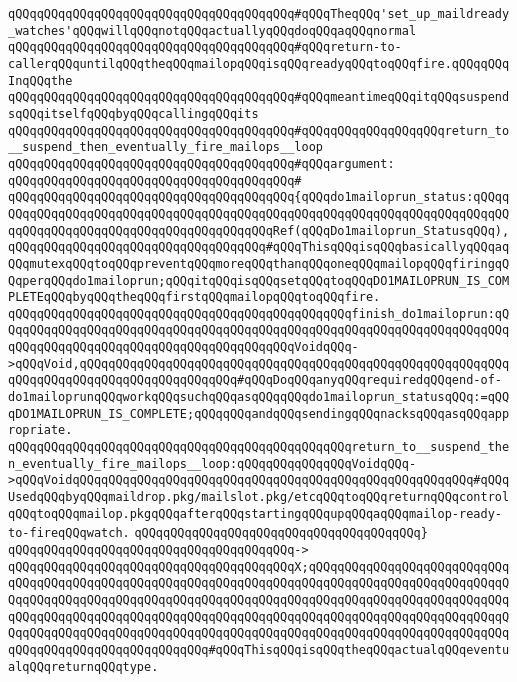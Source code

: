 \verb|qQQqqQQqqQQqqQQqqQQqqQQqqQQqqQQqqQQqqQQq#qQQqTheqQQq'set_up_maildready_watches'qQQqwillqQQqnotqQQqactuallyqQQqdoqQQqaqQQqnormal|\newline
\verb|qQQqqQQqqQQqqQQqqQQqqQQqqQQqqQQqqQQqqQQq#qQQqreturn-to-callerqQQquntilqQQqtheqQQqmailopqQQqisqQQqreadyqQQqtoqQQqfire.qQQqqQQqInqQQqthe|\newline
\verb|qQQqqQQqqQQqqQQqqQQqqQQqqQQqqQQqqQQqqQQq#qQQqmeantimeqQQqitqQQqsuspendsqQQqitselfqQQqbyqQQqcallingqQQqits|\newline
\verb|qQQqqQQqqQQqqQQqqQQqqQQqqQQqqQQqqQQqqQQq#qQQqqQQqqQQqqQQqqQQqreturn_to__suspend_then_eventually_fire_mailops__loop|\newline
\verb|qQQqqQQqqQQqqQQqqQQqqQQqqQQqqQQqqQQqqQQq#qQQqargument:|\newline
\verb|qQQqqQQqqQQqqQQqqQQqqQQqqQQqqQQqqQQqqQQq#|\newline
\verb|qQQqqQQqqQQqqQQqqQQqqQQqqQQqqQQqqQQqqQQq{qQQqdo1mailoprun_status:qQQqqQQqqQQqqQQqqQQqqQQqqQQqqQQqqQQqqQQqqQQqqQQqqQQqqQQqqQQqqQQqqQQqqQQqqQQqqQQqqQQqqQQqqQQqqQQqqQQqqQQqqQQqqQQqRef(qQQqDo1mailoprun_StatusqQQq),qQQqqQQqqQQqqQQqqQQqqQQqqQQqqQQqqQQq#qQQqThisqQQqisqQQqbasicallyqQQqaqQQqmutexqQQqtoqQQqpreventqQQqmoreqQQqthanqQQqoneqQQqmailopqQQqfiringqQQqperqQQqdo1mailoprun;qQQqitqQQqisqQQqsetqQQqtoqQQqDO1MAILOPRUN_IS_COMPLETEqQQqbyqQQqtheqQQqfirstqQQqmailopqQQqtoqQQqfire.|\newline
\verb|qQQqqQQqqQQqqQQqqQQqqQQqqQQqqQQqqQQqqQQqqQQqqQQqfinish_do1mailoprun:qQQqqQQqqQQqqQQqqQQqqQQqqQQqqQQqqQQqqQQqqQQqqQQqqQQqqQQqqQQqqQQqqQQqqQQqqQQqqQQqqQQqqQQqqQQqqQQqqQQqqQQqqQQqqQQqVoidqQQq->qQQqVoid,qQQqqQQqqQQqqQQqqQQqqQQqqQQqqQQqqQQqqQQqqQQqqQQqqQQqqQQqqQQqqQQqqQQqqQQqqQQqqQQqqQQqqQQqqQQq#qQQqDoqQQqanyqQQqrequiredqQQqend-of-do1mailoprunqQQqworkqQQqsuchqQQqasqQQqqQQqdo1mailoprun_statusqQQq:=qQQqDO1MAILOPRUN_IS_COMPLETE;qQQqqQQqandqQQqsendingqQQqnacksqQQqasqQQqappropriate.|\newline
\verb|qQQqqQQqqQQqqQQqqQQqqQQqqQQqqQQqqQQqqQQqqQQqqQQqreturn_to__suspend_then_eventually_fire_mailops__loop:qQQqqQQqqQQqqQQqVoidqQQq->qQQqVoidqQQqqQQqqQQqqQQqqQQqqQQqqQQqqQQqqQQqqQQqqQQqqQQqqQQqqQQq#qQQqUsedqQQqbyqQQqmaildrop.pkg/mailslot.pkg/etcqQQqtoqQQqreturnqQQqcontrolqQQqtoqQQqmailop.pkgqQQqafterqQQqstartingqQQqupqQQqaqQQqmailop-ready-to-fireqQQqwatch.|\newline
\verb|qQQqqQQqqQQqqQQqqQQqqQQqqQQqqQQqqQQqqQQq}|\newline
\verb|qQQqqQQqqQQqqQQqqQQqqQQqqQQqqQQqqQQqqQQq->|\newline
\verb|qQQqqQQqqQQqqQQqqQQqqQQqqQQqqQQqqQQqqQQqX;qQQqqQQqqQQqqQQqqQQqqQQqqQQqqQQqqQQqqQQqqQQqqQQqqQQqqQQqqQQqqQQqqQQqqQQqqQQqqQQqqQQqqQQqqQQqqQQqqQQqqQQqqQQqqQQqqQQqqQQqqQQqqQQqqQQqqQQqqQQqqQQqqQQqqQQqqQQqqQQqqQQqqQQqqQQqqQQqqQQqqQQqqQQqqQQqqQQqqQQqqQQqqQQqqQQqqQQqqQQqqQQqqQQqqQQqqQQqqQQqqQQqqQQqqQQqqQQqqQQqqQQqqQQqqQQqqQQqqQQqqQQqqQQqqQQqqQQqqQQqqQQqqQQqqQQqqQQqqQQqqQQqqQQqqQQqqQQq#qQQqThisqQQqisqQQqtheqQQqactualqQQqeventualqQQqreturnqQQqtype.|\newline
